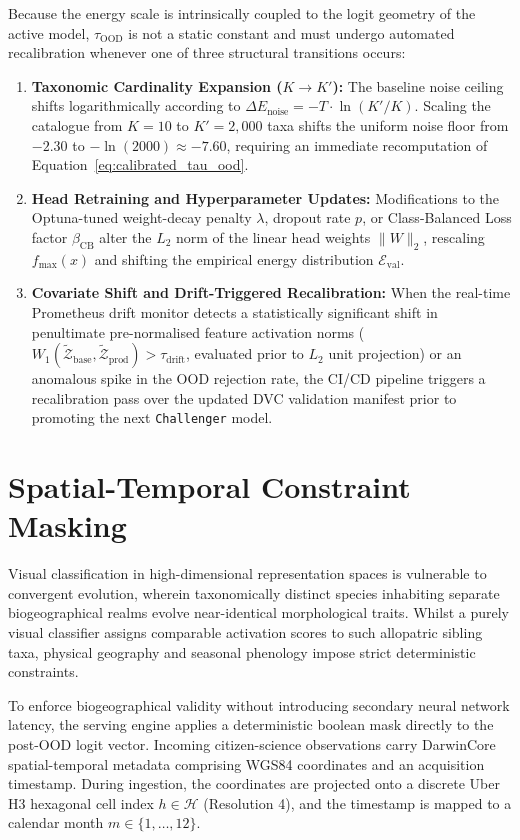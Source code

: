 Because the energy scale is intrinsically coupled to the logit geometry of the active model, $\tau_{\text{OOD}}$ is not a static constant and must undergo automated recalibration whenever one of three structural transitions occurs:
\begin{enumerate}
    \item \textbf{Taxonomic Cardinality Expansion ($K \to K'$):} The baseline noise ceiling shifts logarithmically according to $\Delta E_{\text{noise}} = -T \cdot \ln(K' / K)$. Scaling the catalogue from $K = 10$ to $K' = 2{,}000$ taxa shifts the uniform noise floor from $-2.30$ to $-\ln(2000) \approx -7.60$, requiring an immediate recomputation of Equation~\ref{eq:calibrated_tau_ood}.
    \item \textbf{Head Retraining and Hyperparameter Updates:} Modifications to the Optuna-tuned weight-decay penalty $\lambda$, dropout rate $p$, or Class-Balanced Loss factor $\beta_{\text{CB}}$ alter the $L_2$ norm of the linear head weights $\|W\|_2$, rescaling $f_{\max}(x)$ and shifting the empirical energy distribution $\mathcal{E}_{\text{val}}$.
    \item \textbf{Covariate Shift and Drift-Triggered Recalibration:} When the real-time Prometheus drift monitor detects a statistically significant shift in penultimate pre-normalised feature activation norms ($W_1(\tilde{\mathcal{Z}}_{\text{base}}, \tilde{\mathcal{Z}}_{\text{prod}}) > \tau_{\text{drift}}$, evaluated prior to $L_2$ unit projection) or an anomalous spike in the OOD rejection rate, the CI/CD pipeline triggers a recalibration pass over the updated DVC validation manifest prior to promoting the next \texttt{Challenger} model.
\end{enumerate}

\section{Spatial-Temporal Constraint Masking}
\label{sec:spatial_masking}

Visual classification in high-dimensional representation spaces is vulnerable to convergent evolution, wherein taxonomically distinct species inhabiting separate biogeographical realms evolve near-identical morphological traits. Whilst a purely visual classifier assigns comparable activation scores to such allopatric sibling taxa, physical geography and seasonal phenology impose strict deterministic constraints.

To enforce biogeographical validity without introducing secondary neural network latency, the serving engine applies a deterministic boolean mask directly to the post-OOD logit vector. Incoming citizen-science observations carry DarwinCore spatial-temporal metadata comprising WGS84 coordinates and an acquisition timestamp. During ingestion, the coordinates are projected onto a discrete Uber H3 hexagonal cell index $h \in \mathcal{H}$ (Resolution 4), and the timestamp is mapped to a calendar month $m \in \{1, \dots, 12\}$.

